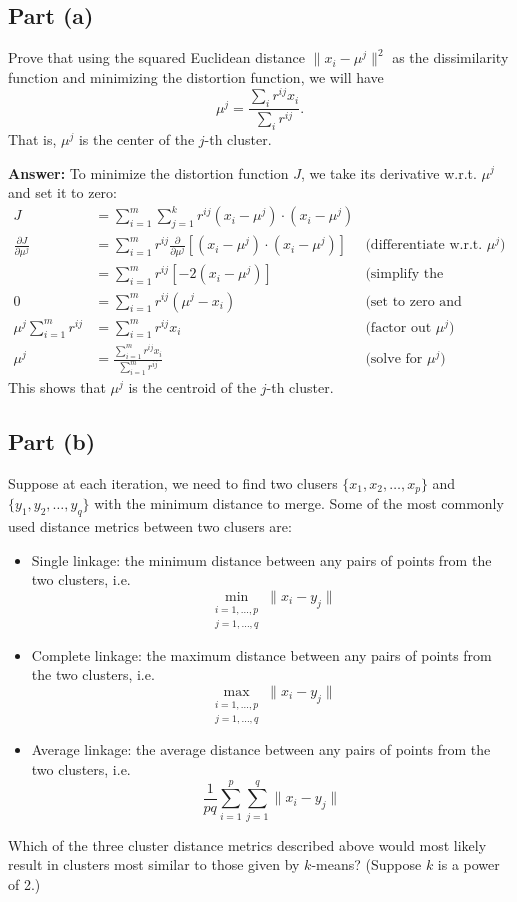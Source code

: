 \documentclass{article}
\begin{document}
\subsection{Part (a)}
Prove that using the squared Euclidean distance $\|x_i - \mu^j\|^2$ as the dissimilarity function and minimizing the distortion function, we will have
$$\mu^j = \frac{\sum_i r^{ij} x_i}{\sum_i r^{ij}}.$$
That is, $\mu^j$ is the center of the $j$-th cluster.

\textbf{Answer:} To minimize the distortion function \(J\), we take its derivative w.r.t. \(\mu^j\) and set it to zero:
\begin{align*}
    J &= \sum_{i=1}^m \sum_{j=1}^k r^{ij} (x_i - \mu^j) \cdot (x_i - \mu^j) \\
    \frac{\partial J}{\partial \mu^j} &= \sum_{i=1}^m r^{ij} \frac{\partial}{\partial \mu^j} [(x_i - \mu^j) \cdot (x_i - \mu^j)] & \text{(differentiate w.r.t. $\mu^j$)} \\
    &= \sum_{i=1}^m r^{ij} [-2(x_i - \mu^j)] & \text{(simplify the derivative)} \\
    0 &= \sum_{i=1}^m r^{ij} (\mu^j - x_i) & \text{(set to zero and simplify)} \\
    \mu^j \sum_{i=1}^m r^{ij} &= \sum_{i=1}^m r^{ij} x_i & \text{(factor out $\mu^j$)} \\
    \mu^j &= \frac{\sum_{i=1}^m r^{ij} x_i}{\sum_{i=1}^m r^{ij}} & \text{(solve for $\mu^j$)}
\end{align*}
This shows that \(\mu^j\) is the centroid of the \(j\)-th cluster.

\subsection{Part (b)}

Suppose at each iteration, we need to find two clusers $\{x_1, x_2, \dots, x_p\}$ and $\{y_1, y_2, \dots, y_q\}$ with the minimum distance to merge.
Some of the most commonly used distance metrics between two clusers are:
\begin{itemize}
    \item Single linkage: the minimum distance between any pairs of points from the two clusters, i.e.
    $$\min_{\substack{i=1,\dots,p\\j=1,\dots,q}} \|x_i - y_j\|$$
    \item Complete linkage: the maximum distance between any pairs of points from the two clusters, i.e.
    $$\max_{\substack{i=1,\dots,p\\j=1,\dots,q}} \|x_i - y_j\|$$
    \item Average linkage: the average distance between any pairs of points from the two clusters, i.e.
    $$\frac{1}{pq} \sum_{i=1}^p \sum_{j=1}^q \|x_i - y_j\|$$
\end{itemize}
Which of the three cluster distance metrics described above would most likely result in clusters most similar to those given by $k$-means?
(Suppose $k$ is a power of 2.)
\end{document}
